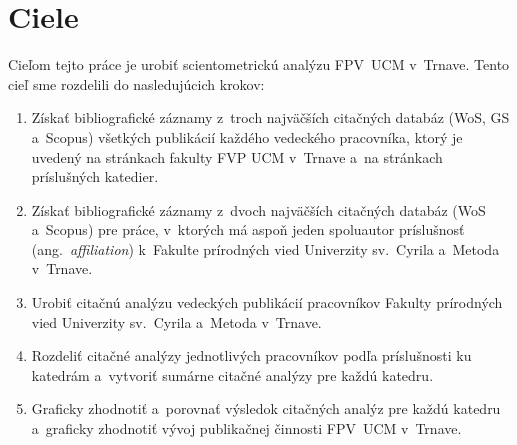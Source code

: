 \chapter{Ciele}
\label{chap:objectives}

Cieľom tejto práce je urobiť scientometrickú analýzu FPV~UCM v~Trnave.  Tento
cieľ sme rozdelili do nasledujúcich krokov:

\begin{enumerate}
\item Získať bibliografické záznamy z~troch najväčších citačných databáz (WoS,
  GS a~Scopus) všetkých publikácií každého vedeckého pracovníka, ktorý je
  uvedený na stránkach fakulty FVP UCM v~Trnave a~na stránkach príslušných
  katedier.
\item Získať bibliografické záznamy z~dvoch najväčších citačných databáz (WoS
  a~Scopus) pre práce, v~ktorých má aspoň jeden spoluautor príslušnosť
  (ang.~\emph{affiliation}) k~Fakulte prírodných vied Univerzity sv.~Cyrila
  a~Metoda v~Trnave.
\item Urobiť citačnú analýzu vedeckých publikácií pracovníkov Fakulty prírodných
  vied Univerzity sv.~Cyrila a~Metoda v~Trnave.
\item Rozdeliť citačné analýzy jednotlivých pracovníkov podľa príslušnosti ku
  katedrám a~vytvoriť sumárne citačné analýzy pre každú katedru.
\item Graficky zhodnotiť a~porovnať výsledok citačných analýz pre každú katedru
  a~graficky zhodnotiť vývoj publikačnej činnosti FPV~UCM v~Trnave.
\end{enumerate}


